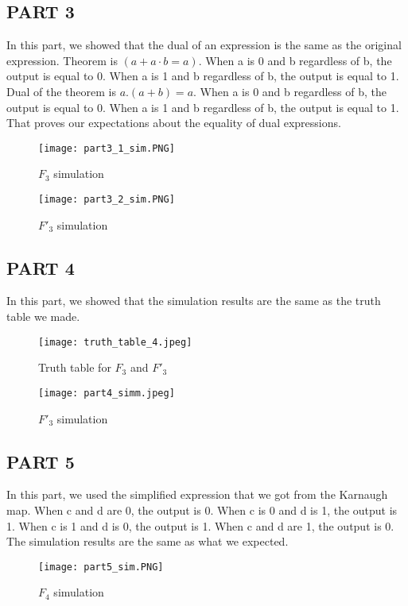 \documentclass[pdftex,12pt,a4paper]{article}
\begin{document}
\subsection{PART 3}
In this part, we showed that the dual of an expression is the same as the original expression. Theorem is \((a+a·b=a)\). When a is 0 and b regardless of b, the output is equal to 0. When a is 1 and b regardless of b, the output is equal to 1. Dual of the theorem is \( a . (a + b) = a\). When a is 0 and b regardless of b, the output is equal to 0. When a is 1 and b regardless of b, the output is equal to 1. That proves our expectations about the equality of dual expressions. 

\begin{figure}[ht]
	\centering
	\texttt{[image: part3\_1\_sim.PNG]}	
	\caption{\(F_3\) simulation}
	\label{fig14}
\end{figure}
\begin{figure}[ht]
	\centering
	\texttt{[image: part3\_2\_sim.PNG]}	
	\caption{\(F'_3\) simulation}
	\label{fig15}
\end{figure}
\clearpage



\subsection{PART 4}
In this part, we showed that the simulation results are the same as the truth table we made.

\begin{figure}[ht]
	\centering
	\texttt{[image: truth\_table\_4.jpeg]}	
	\caption{Truth table for \(F_3\) and \(F'_3\)}
	\label{fig8}
	
\end{figure}
\begin{figure}[ht]
	\centering
	\texttt{[image: part4\_simm.jpeg]}	
	\caption{\(F'_3\) simulation}
	\label{fig15}
\end{figure}

\clearpage
\subsection{PART 5}
In this part, we used the simplified expression that we got from the Karnaugh map. When c and d are 0, the output is 0. When c is 0 and d is 1, the output is 1. When c is 1 and d is 0, the output is 1. When c and d are 1, the output is 0. The simulation results are the same as what we expected.
\begin{figure}[ht]
	\centering
	\texttt{[image: part5\_sim.PNG]}	
	\caption{\(F_4\) simulation}
	\label{fig16}
\end{figure}
\end{document}
